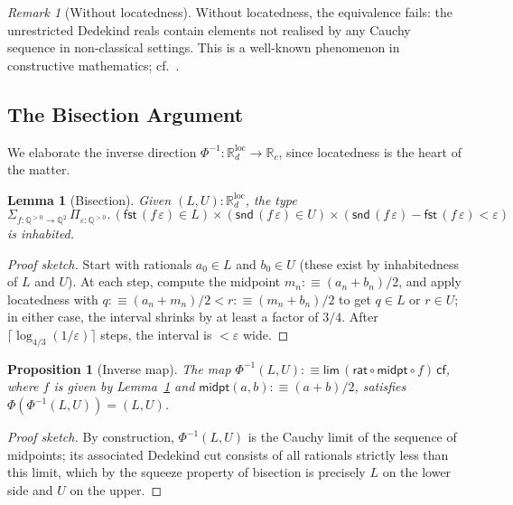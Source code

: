 \documentclass[12pt]{article}
\newtheorem{proposition}[theorem]{Proposition}
\newtheorem{lemma}[theorem]{Lemma}
\theoremstyle{definition}
\theoremstyle{remark}
\newtheorem{remark}[theorem]{Remark}
\newcommand{\Q}{\mathbb{Q}}
\newcommand{\Rc}{\mathbb{R}_{c}}
\newcommand{\Rd}{\mathbb{R}_{d}}
\newcommand{\fst}{\mathsf{fst}}
\newcommand{\snd}{\mathsf{snd}}
\newcommand{\rat}{\mathsf{rat}}
\newcommand{\hlim}{\mathsf{lim}}
\begin{document}
\begin{remark}[Without locatedness]
\label{rem:no-located}
Without locatedness, the equivalence fails: the unrestricted Dedekind
reals contain elements not realised by any Cauchy sequence in
non-classical settings. This is a well-known phenomenon in constructive
mathematics; cf.\ \cite{BridgesRichman}.
\end{remark}

\subsection{The Bisection Argument}

We elaborate the inverse direction $\Phi^{-1} : \Rd^{\text{loc}} \to \Rc$,
since locatedness is the heart of the matter.

\begin{lemma}[Bisection]
\label{lem:bisect}
Given $(L, U) : \Rd^{\text{loc}}$, the type
\[
\Sigma_{f : \Q^{>0} \to \Q^2}\,
   \Pi_{\varepsilon : \Q^{>0}}.\,
   (\fst\,(f\,\varepsilon) \in L) \times (\snd\,(f\,\varepsilon) \in U)
   \times (\snd\,(f\,\varepsilon) - \fst\,(f\,\varepsilon) < \varepsilon)
\]
is inhabited.
\end{lemma}
\begin{proof}[Proof sketch]
Start with rationals $a_0 \in L$ and $b_0 \in U$ (these exist by
inhabitedness of $L$ and $U$). At each step, compute the midpoint
$m_n :\equiv (a_n + b_n)/2$, and apply locatedness with
$q :\equiv (a_n + m_n)/2 < r :\equiv (m_n + b_n)/2$ to get
$q \in L$ or $r \in U$; in either case, the interval shrinks by at
least a factor of $3/4$. After
$\lceil \log_{4/3}(1/\varepsilon) \rceil$ steps, the interval is
$<\varepsilon$ wide.
\end{proof}

\begin{proposition}[Inverse map]
\label{prop:inverse}
The map $\Phi^{-1}(L, U) :\equiv \hlim\,(\rat \circ \mathsf{midpt} \circ f)\,\mathsf{cf}$,
where $f$ is given by Lemma~\ref{lem:bisect} and
$\mathsf{midpt}(a, b) :\equiv (a+b)/2$, satisfies
$\Phi(\Phi^{-1}(L, U)) = (L, U)$.
\end{proposition}
\begin{proof}[Proof sketch]
By construction, $\Phi^{-1}(L, U)$ is the Cauchy limit of the sequence
of midpoints; its associated Dedekind cut consists of all rationals
strictly less than this limit, which by the squeeze property of
bisection is precisely $L$ on the lower side and $U$ on the upper.
\end{proof}
\end{document}
